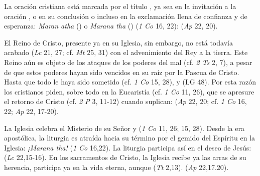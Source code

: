 

\begin{ccebody}
 La oración cristiana está marcada por el título , ya sea en la invitación a la oración , o en su conclusión  o incluso en la exclamación llena de confianza y de esperanza: \emph{Maran atha} () o \emph{Marana tha} () (\emph{1 Co} 16, 22):  (\emph{Ap} 22, 20).



 El Reino de Cristo, presente ya en su Iglesia, sin embargo, no está todavía acabado  (\emph{Lc} 21, 27; cf. \emph{Mt} 25, 31) con el advenimiento del Rey a la tierra. Este Reino aún es objeto de los ataques de los poderes del mal (cf. \emph{2 Ts} 2, 7), a pesar de que estos poderes hayan sido vencidos en su raíz por la Pascua de Cristo. Hasta que todo le haya sido sometido (cf. \emph{1 Co} 15, 28), y  (LG 48). Por esta razón los cristianos piden, sobre todo en la Eucaristía (cf. \emph{1 Co} 11, 26), que se apresure el retorno de Cristo (cf. \emph{2 P} 3, 11-12) cuando suplican:  (\emph{Ap} 22, 20; cf. \emph{1 Co} 16, 22; \emph{Ap} 22, 17-20).


 La Iglesia celebra el Misterio de su Señor  y  (\emph{1 Co} 11, 26; 15, 28). Desde la era apostólica, la liturgia es atraída hacia su término por el gemido del Espíritu en la Iglesia: \emph{¡Marana tha!} (\emph{1 Co} 16,22). La liturgia participa así en el deseo de Jesús:  (\emph{Lc} 22,15-16). En los sacramentos de Cristo, la Iglesia recibe ya las arras de su herencia, participa ya en la vida eterna, aunque  (\emph{Tt} 2,13).  (\emph{Ap} 22,17.20).


\end{ccebody}
